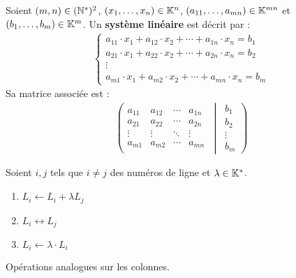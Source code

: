 \begin{definition}
    Soient $(m,n) \in (\mathbb{N}^*)^2$, $(x_1, \ldots, x_n) \in \mathbb{K}^n$, $(a_{11}, \ldots, a_{mn}) \in \mathbb{K}^{mn}$ et $(b_1, \ldots, b_m) \in \mathbb{K}^m$.
    Un \textbf{système linéaire} est décrit par :
    \begin{align*}
        \begin{cases}
            a_{11} \cdot x_1 + a_{12} \cdot x_2 + \cdots + a_{1n} \cdot x_n = b_1 \\
            a_{21} \cdot x_1 + a_{22} \cdot x_2 + \cdots + a_{2n} \cdot x_n = b_2 \\
            \vdots \\
            a_{m1} \cdot x_1 + a_{m2} \cdot x_2 + \cdots + a_{mn} \cdot x_n = b_m
        \end{cases}
    \end{align*}        
    Sa matrice associée est : 
    \begin{align*}
        \left(
        \begin{matrix}    
            a_{11} & a_{12} & \cdots & a_{1n} \\
            a_{21} & a_{22} & \cdots & a_{2n} \\
            \vdots & \vdots & \ddots & \vdots \\
            a_{m1} & a_{m2} & \cdots & a_{mn}
        \end{matrix}
        \
        \middle|
        \
        \begin{matrix}
            b_1 \\
            b_2 \\
            \vdots \\
            b_m
        \end{matrix}
        \right)
    \end{align*}
\end{definition}

\begin{definition}
	Soient $i, j$ tels que $i \neq j$ des numéros de ligne et $\lambda \in \mathbb{K}^*$.
	\begin{enumerate}
		\item $L_i \leftarrow L_i + \lambda L_j$ 
		\item $L_i \leftrightarrow L_j$
		\item $L_i \leftarrow \lambda \cdot L_i$
	\end{enumerate}
	Opérations analogues sur les colonnes.
\end{definition}

